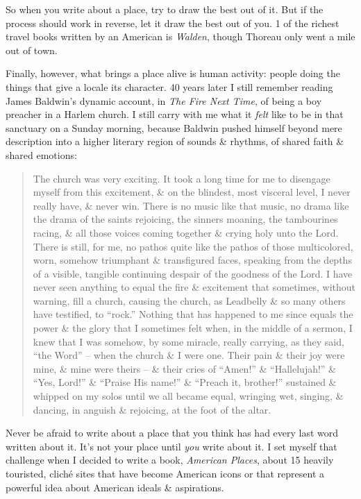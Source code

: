 \documentclass{article}
\begin{document}
So when you write about a place, try to draw the best out of it. But if the process should work in reverse, let it draw the best out of you. 1 of the richest travel books written by an American is \textit{Walden}, though Thoreau only went a mile out of town.

Finally, however, what brings a place alive is human activity: people doing the things that give a locale its character. 40 years later I still remember reading James Baldwin's dynamic account, in \textit{The Fire Next Time}, of being a boy preacher in a Harlem church. I still carry with me what it \textit{felt} like to be in that sanctuary on a Sunday morning, because Baldwin pushed himself beyond mere description into a higher literary region of sounds \& rhythms, of shared faith \& shared emotions:
\begin{quotation}
	The church was very exciting. It took a long time for me to disengage myself from this excitement, \& on the blindest, most visceral level, I never really have, \& never win. There is no music like that music, no drama like the drama of the saints rejoicing, the sinners moaning, the tambourines racing, \& all those voices coming together \& crying holy unto the Lord. There is still, for me, no pathos quite like the pathos of those multicolored, worn, somehow triumphant \& transfigured faces, speaking from the depths of a visible, tangible continuing despair of the goodness of the Lord. I have never seen anything to equal the fire \& excitement that sometimes, without warning, fill a church, causing the church, as Leadbelly \& so many others have testified, to ``rock.'' Nothing that has happened to me since equals the power \& the glory that I sometimes felt when, in the middle of a sermon, I knew that I was somehow, by some miracle, really carrying, as they said, ``the Word'' -- when the church \& I were one. Their pain \& their joy were mine, \& mine were theirs -- \& their cries of ``Amen!'' \& ``Hallelujah!'' \& ``Yes, Lord!'' \& ``Praise His name!'' \& ``Preach it, brother!'' sustained \& whipped on my solos until we all became equal, wringing wet, singing, \& dancing, in anguish \& rejoicing, at the foot of the altar.
\end{quotation}
Never be afraid to write about a place that you think has had every last word written about it. It's not your place until \textit{you} write about it. I set myself that challenge when I decided to write a book, \textit{American Places}, about 15 heavily touristed, clich\'e sites that have become American icons or that represent a powerful idea about American ideals \& aspirations.
\end{document}
